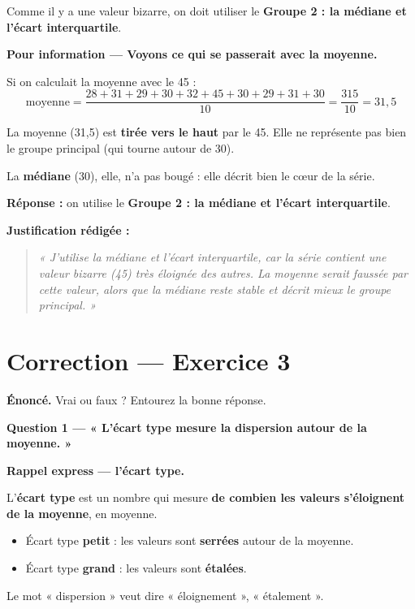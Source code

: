 \documentclass[12pt,a4paper]{article}
\begin{document}
Comme il y a une valeur bizarre, on doit utiliser le \textbf{Groupe 2 : la médiane et l'écart interquartile}.

\vspace{0.3cm}
\textbf{Pour information — Voyons ce qui se passerait avec la moyenne.}

Si on calculait la moyenne avec le 45 :
\[
\text{moyenne} = \frac{28+31+29+30+32+45+30+29+31+30}{10} = \frac{315}{10} = 31{,}5
\]

La moyenne (31,5) est \textbf{tirée vers le haut} par le 45. Elle ne représente pas bien le groupe principal (qui tourne autour de 30).

La \textbf{médiane} (30), elle, n'a pas bougé : elle décrit bien le cœur de la série.

\vspace{0.3cm}
\textbf{Réponse :} on utilise le \textbf{Groupe 2 : la médiane et l'écart interquartile}.

\vspace{0.3cm}
\textbf{Justification rédigée :}
\begin{quote}
\textit{« J'utilise la médiane et l'écart interquartile, car la série contient une valeur bizarre (45) très éloignée des autres. La moyenne serait faussée par cette valeur, alors que la médiane reste stable et décrit mieux le groupe principal. »}
\end{quote}

\newpage

\section*{Correction — Exercice 3}

\textbf{Énoncé.} Vrai ou faux ? Entourez la bonne réponse.

\vspace{0.4cm}

\begin{correctionbox}
\textbf{Question 1 — « L'écart type mesure la dispersion autour de la moyenne. »}
\end{correctionbox}

\begin{rappelcible}
\textbf{Rappel express — l'écart type.}

\vspace{0.2cm}
L'\textbf{écart type} est un nombre qui mesure \textbf{de combien les valeurs s'éloignent de la moyenne}, en moyenne.

\vspace{0.2cm}
\begin{itemize}[leftmargin=*]
  \item Écart type \textbf{petit} : les valeurs sont \textbf{serrées} autour de la moyenne.
  \item Écart type \textbf{grand} : les valeurs sont \textbf{étalées}.
\end{itemize}

\vspace{0.2cm}
Le mot « dispersion » veut dire « éloignement », « étalement ».
\end{rappelcible}
\end{document}
